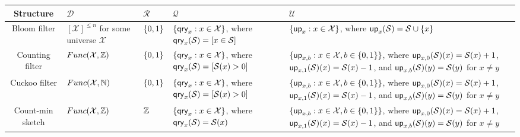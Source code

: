 \begin{table}[thp]
\begin{center}
  \begin{tabular}{ | c | p{3cm} | p{1cm} | p{4cm} | p{4cm} | }
    \hline
    Structure & $\mathcal{D}$ & $\mathcal{R}$ & $\mathcal{Q}$ & $\mathcal{U}$ \\ \hline
    Bloom filter & $[\mathcal{X}]^{\le n}$ for some universe $\mathcal{X}$ & $\{0,1\}$ & $\{\mathsf{qry}_x: x \in \mathcal{X}\}$, where $\mathsf{qry}_x(\mathcal{S}) = [x \in \mathcal{S}]$ & $\{\mathsf{up}_x : x \in \mathcal{X}\}$, where $\mathsf{up}_x(\mathcal{S}) = \mathcal{S} \cup \{x\}$ \\ \hline
    Counting filter & $Func(\mathcal{X},\mathbb{Z})$ & $\{0,1\}$ & $\{\mathsf{qry}_x: x \in \mathcal{X}\}$, where $\mathsf{qry}_x(\mathcal{S}) = [\mathcal{S}(x) > 0]$ & $\{\mathsf{up}_{x,b} : x \in \mathcal{X}, b \in \{0,1\}\}$, where $\mathsf{up}_{x,0}(\mathcal{S})(x) = \mathcal{S}(x)+1$, $\mathsf{up}_{x,1}(\mathcal{S})(x) = \mathcal{S}(x)-1$, and $\mathsf{up}_{x,b}(\mathcal{S})(y) = \mathcal{S}(y)$ for $x \neq y$ \\ \hline
    Cuckoo filter & $Func(\mathcal{X},\mathbb{N})$ & $\{0,1\}$ & $\{\mathsf{qry}_x: x \in \mathcal{X}\}$, where $\mathsf{qry}_x(\mathcal{S}) = [\mathcal{S}(x) > 0]$ & $\{\mathsf{up}_{x,b} : x \in \mathcal{X}, b \in \{0,1\}\}$, where $\mathsf{up}_{x,0}(\mathcal{S})(x) = \mathcal{S}(x)+1$, $\mathsf{up}_{x,1}(\mathcal{S})(x) = \mathcal{S}(x)-1$, and $\mathsf{up}_{x,b}(\mathcal{S})(y) = \mathcal{S}(y)$ for $x \neq y$ \\ \hline
    Count-min sketch & $Func(\mathcal{X},\mathbb{Z})$ & $\mathbb{Z}$ & $\{\mathsf{qry}_x: x \in \mathcal{X}\}$, where $\mathsf{qry}_x(\mathcal{S}) = \mathcal{S}(x)$ & $\{\mathsf{up}_{x,b} : x \in \mathcal{X}, b \in \{0,1\}\}$, where $\mathsf{up}_{x,0}(\mathcal{S})(x) = \mathcal{S}(x)+1$, $\mathsf{up}_{x,1}(\mathcal{S})(x) = \mathcal{S}(x)-1$, and $\mathsf{up}_{x,b}(\mathcal{S})(y) = \mathcal{S}(y)$ for $x \neq y$ \\ \hline
  \end{tabular}
\end{center}
\end{table}

